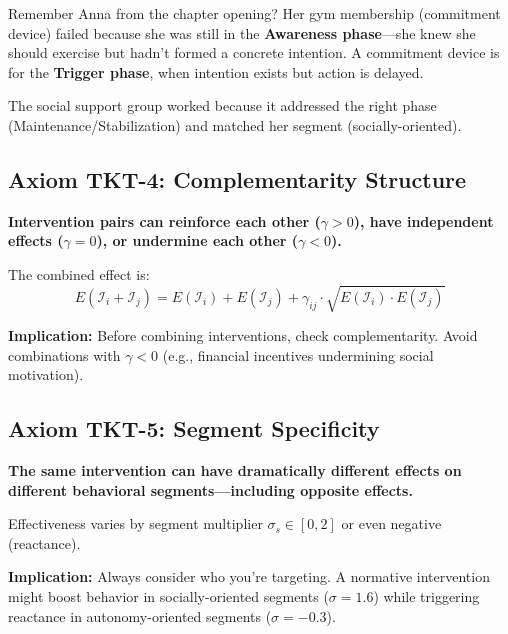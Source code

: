 \begin{tcolorbox}[colback=yellow!5!white, colframe=yellow!75!black,
    title=Example: Anna's Misaligned Intervention]
Remember Anna from the chapter opening? Her gym membership (commitment device) failed because she was still in the \textbf{Awareness phase}---she knew she should exercise but hadn't formed a concrete intention. A commitment device is for the \textbf{Trigger phase}, when intention exists but action is delayed.

The social support group worked because it addressed the right phase (Maintenance/Stabilization) and matched her segment (socially-oriented).
\end{tcolorbox}

\subsection{Axiom TKT-4: Complementarity Structure}

\begin{tcolorbox}[colback=gray!5!white, colframe=gray!75!black,
    title=Axiom TKT-4: Complementarity Structure]
\textbf{Intervention pairs can reinforce each other ($\gamma > 0$), have independent effects ($\gamma = 0$), or undermine each other ($\gamma < 0$).}

The combined effect is:
\begin{equation}
E(\mathcal{I}_i + \mathcal{I}_j) = E(\mathcal{I}_i) + E(\mathcal{I}_j) + \gamma_{ij} \cdot \sqrt{E(\mathcal{I}_i) \cdot E(\mathcal{I}_j)}
\end{equation}

\textbf{Implication:} Before combining interventions, check complementarity. Avoid combinations with $\gamma < 0$ (e.g., financial incentives undermining social motivation).
\end{tcolorbox}

\subsection{Axiom TKT-5: Segment Specificity}

\begin{tcolorbox}[colback=gray!5!white, colframe=gray!75!black,
    title=Axiom TKT-5: Segment Specificity]
\textbf{The same intervention can have dramatically different effects on different behavioral segments---including opposite effects.}

Effectiveness varies by segment multiplier $\sigma_s \in [0, 2]$ or even negative (reactance).

\textbf{Implication:} Always consider who you're targeting. A normative intervention might boost behavior in socially-oriented segments ($\sigma = 1.6$) while triggering reactance in autonomy-oriented segments ($\sigma = -0.3$).
\end{tcolorbox}


